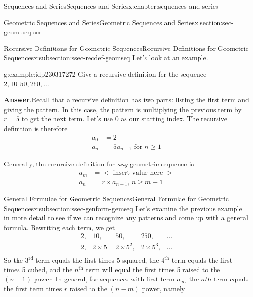 \documentclass[twoside,10pt,]{book}
\newcommand{\blocktitlefont}{\relax}
\numberwithin{equation}{section}
\newcommand{\nth}{{n^{\text{th}}}}
\newcommand{\upth}[1]{{#1^{\text{th}}}}
\newcommand{\uprd}[1]{{#1^{\text{rd}}}}
\newcommand{\lt}{<}
\newcommand{\gt}{>}
\newcommand{\amp}{&}
\begin{document}
\begin{chapterptx}{Sequences and Series}{}{Sequences and Series}{}{}{x:chapter:sequences-and-series}
\begin{sectionptx}{Geometric Sequences and Series}{}{Geometric Sequences and Series}{}{}{x:section:sec-geom-seq-ser}
\typeout{************************************************}
%
\begin{subsectionptx}{Recursive Definitions for Geometric Sequences}{}{Recursive Definitions for Geometric Sequences}{}{}{x:subsection:ssec-recdef-geomseq}
Let's look at an example. \begin{example}{}{g:example:idp230317272}%
Give a recursive definition for the sequence \(2, 10, 50, 250, \ldots\)\par\smallskip%
\noindent\textbf{\blocktitlefont Answer}.\label{g:answer:idp230320216}{}\hypertarget{g:answer:idp230320216}{}\quad{}Recall that a recursive definition has two parts:  listing the first term and giving the pattern.  In this case, the pattern is multiplying the previous term by \(r = 5\)  to get the next term.  Let's use 0 as our starting index.  The recursive definition is therefore%
\begin{align*}
a_0 \amp = 2\\
a_n \amp = 5a_{n - 1} \text{   for } n \ge 1
\end{align*}
\end{example}
%
\par
Generally, the recursive definition for \emph{any} geometric sequence is%
\begin{align*}
a_m \amp = \lt \text{ insert value here } \gt\\
a_n \amp = r\times a_{n-1},\, n \ge m+1
\end{align*}
%
\end{subsectionptx}
%
%
\typeout{************************************************}
\typeout{************************************************}
%
\begin{subsectionptx}{General Formulae for Geometric Sequences}{}{General Formulae for Geometric Sequences}{}{}{x:subsection:ssec-genform-gemseq}
Let's examine the previous example in more detail to see if we can recognize any patterns and come up with a general formula.  Rewriting each term, we get%
\begin{equation*}
\begin{array}{*{20}{c}}
2,\amp 10,\amp 50,\amp 250,\amp \ldots\\
2,\amp 2 \times 5,\amp 2 \times {5^2},\amp 2 \times {5^3},\amp \ldots\\
\end{array}
\end{equation*}
So the \(\uprd{3}\) term equals the first times 5 squared, the \(\upth{4}\) term equals the first times 5 cubed, and the \(\nth{}\) term will equal the first times 5 raised to the \((n - 1)\) power.  In general, for sequences with first term \(a_m\), the \(nth{}\) term equals the first term times \(r\) raised to the \((n - m)\) power, namely%

\end{subsectionptx}
\end{sectionptx}
\end{chapterptx}
\end{document}

